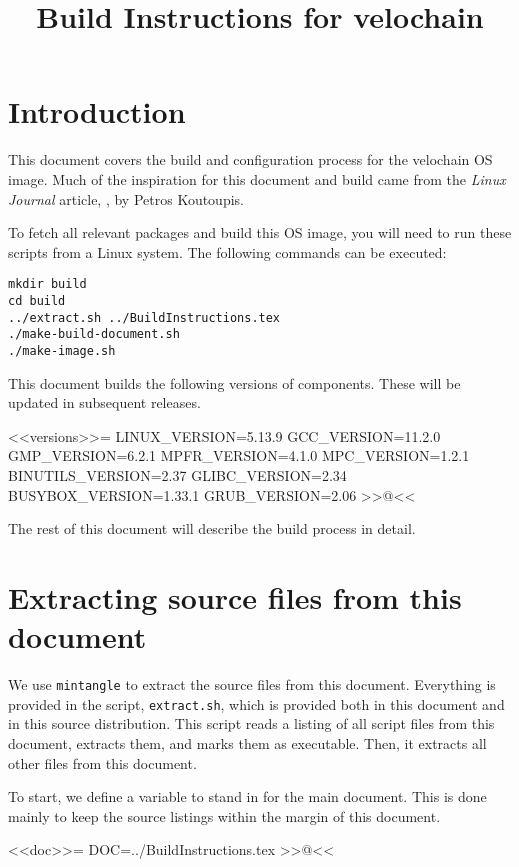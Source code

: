 \title{Build Instructions for velochain}

\section{Introduction}

This document covers the build and configuration process for the velochain OS
image. Much of the inspiration for this document and build came from the
\emph{Linux Journal} article,
, by Petros
Koutoupis.

To fetch all relevant packages and build this OS image, you will need to run
these scripts from a Linux system.  The following commands can be executed:

\begin{lstlisting}
mkdir build
cd build
../extract.sh ../BuildInstructions.tex
./make-build-document.sh
./make-image.sh
\end{lstlisting}

This document builds the following versions of components. These will be updated
in subsequent releases.

<<versions>>=
LINUX_VERSION=5.13.9
GCC_VERSION=11.2.0
GMP_VERSION=6.2.1
MPFR_VERSION=4.1.0
MPC_VERSION=1.2.1
BINUTILS_VERSION=2.37
GLIBC_VERSION=2.34
BUSYBOX_VERSION=1.33.1
GRUB_VERSION=2.06
>>@<<

The rest of this document will describe the build process in detail.

\section{Extracting source files from this document}

We use \verb/mintangle/ to extract the source files from this document.
Everything is provided in the script, \verb/extract.sh/, which is provided both
in this document and in this source distribution.  This script reads a listing
of all script files from this document, extracts them, and marks them as
executable.  Then, it extracts all other files from this document.

To start, we define a variable to stand in for the main document.  This is done
mainly to keep the source listings within the margin of this document.

<<doc>>=
DOC=../BuildInstructions.tex
>>@<<

